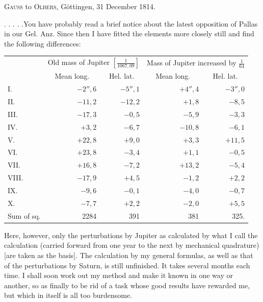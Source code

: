 \par{}\bigskip
\begin{center}
\textsc{Gauss} to \textsc{Olbers}, Göttingen, 31 December 1814.
\end{center}
\noindent\hspace*{\parindent}. . . . .\quad You have probably read a brief notice about the latest opposition of Pallas in our Gel. Anz. Since then I have fitted the elements more closely still and find the following differences:
\begin{center}
\begingroup\small\setlength{\tabcolsep}{5pt}
\begin{tabular}{@{}lrrrr@{}}
&\multicolumn{2}{c}{Old mass of Jupiter \(\left[\frac{1}{1067{,}09}\right]\)}&\multicolumn{2}{c}{Mass of Jupiter increased by \(\frac{1}{64}\)}\\[3pt]
&\multicolumn{1}{c}{Mean long.}&\multicolumn{1}{c}{Hel. lat.}&\multicolumn{1}{c}{Mean long.}&\multicolumn{1}{c}{Hel. lat.}\\
I.&\(-2''{,}6\)&\(-5''{,}1\)&\(+4''{,}4\)&\(-3''{,}0\)\\
II.&\(-11{,}2\)&\(-12{,}2\)&\(+1{,}8\)&\(-8{,}5\)\\
III.&\(-17{,}3\)&\(-0{,}5\)&\(-5{,}9\)&\(-3{,}3\)\\
IV.&\(+3{,}2\)&\(-6{,}7\)&\(-10{,}8\)&\(-6{,}1\)\\
V.&\(+22{,}8\)&\(+9{,}0\)&\(+3{,}3\)&\(+11{,}5\)\\
VI.&\(+23{,}8\)&\(-3{,}4\)&\(+1{,}1\)&\(-0{,}5\)\\
VII.&\(+16{,}8\)&\(-7{,}2\)&\(+13{,}2\)&\(-5{,}4\)\\
VIII.&\(-17{,}9\)&\(+4{,}5\)&\(-1{,}2\)&\(+2{,}2\)\\
IX.&\(-9{,}6\)&\(-0{,}1\)&\(-4{,}0\)&\(-0{,}7\)\\
X.&\(-7{,}7\)&\(+2{,}2\)&\(-2{,}0\)&\(+5{,}5\)\\
Sum of sq.&2284&391&381&325.
\end{tabular}
\endgroup
\end{center}
\par{}Here, however, only the perturbations by Jupiter as calculated by what I call the  calculation (carried forward from one year to the next by mechanical quadrature) [are taken as the basis]. The calculation by my general formulas, as well as that of the perturbations by Saturn, is still unfinished. It takes several months each time. I shall soon work out my method and make it known in one way or another, so as finally to be rid of a task whose good results have rewarded me, but which in itself is all too burdensome.
\par

